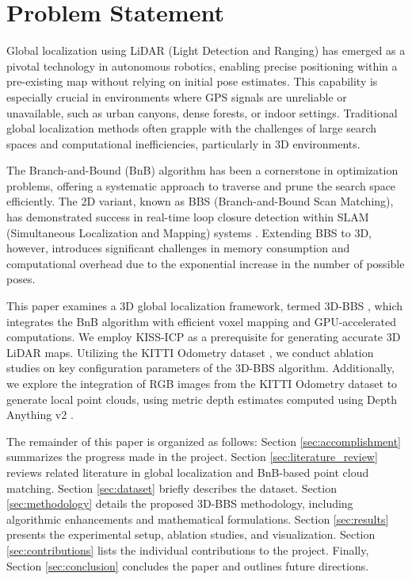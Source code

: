 \section{Problem Statement}
\label{sec:problem_statement}

Global localization using LiDAR (Light Detection and Ranging) has emerged as a pivotal technology in autonomous robotics, enabling precise positioning within a pre-existing map without relying on initial pose estimates. This capability is especially crucial in environments where GPS signals are unreliable or unavailable, such as urban canyons, dense forests, or indoor settings. Traditional global localization methods often grapple with the challenges of large search spaces and computational inefficiencies, particularly in 3D environments.

The Branch-and-Bound (BnB) algorithm has been a cornerstone in optimization problems, offering a systematic approach to traverse and prune the search space efficiently. The 2D variant, known as BBS (Branch-and-Bound Scan Matching), has demonstrated success in real-time loop closure detection within SLAM (Simultaneous Localization and Mapping) systems \cite{Hess2016}. Extending BBS to 3D, however, introduces significant challenges in memory consumption and computational overhead due to the exponential increase in the number of possible poses.

This paper examines a 3D global localization framework, termed 3D-BBS \cite{aoki20243dbbsgloballocalization3d}, which integrates the BnB algorithm with efficient voxel mapping and GPU-accelerated computations. We employ KISS-ICP \cite{Vizzo_2023} as a prerequisite for generating accurate 3D LiDAR maps. Utilizing the KITTI Odometry dataset \cite{Geiger2013}, we conduct ablation studies on key configuration parameters of the 3D-BBS algorithm. Additionally, we explore the integration of RGB images from the KITTI Odometry dataset to generate local point clouds, using metric depth estimates computed using Depth Anything v2 \cite{yang2024depthv2}.

The remainder of this paper is organized as follows: Section \ref{sec:accomplishment} summarizes the progress made in the project. Section \ref{sec:literature_review} reviews related literature in global localization and BnB-based point cloud matching. Section \ref{sec:dataset} briefly describes the dataset. Section \ref{sec:methodology} details the proposed 3D-BBS methodology, including algorithmic enhancements and mathematical formulations. Section \ref{sec:results} presents the experimental setup, ablation studies, and visualization. Section \ref{sec:contributions} lists the individual contributions to the project. Finally, Section \ref{sec:conclusion} concludes the paper and outlines future directions.
